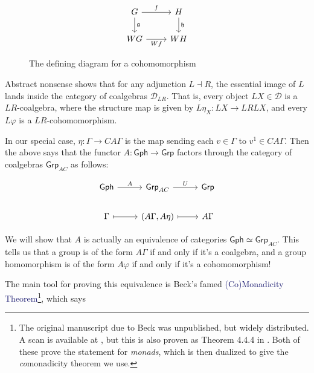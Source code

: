 \documentclass[12pt]{article}
\theoremstyle{definition}
\theoremstyle{theorem}
\newcommand*{\catFont}[1]{\mathsf{#1}}
\newcommand{\Grp}{\catFont{Grp}}
\newcommand*{\important}[1]{\textcolor{MidnightBlue}{#1}}
\begin{document}
\begin{figure}
    \[
        \begin{tikzcd}
        G & H \\
        WG & WH
        \arrow["\mathfrak{g}", from=1-1, to=2-1]
        \arrow["\mathfrak{h}", from=1-2, to=2-2]
        \arrow["f", from=1-1, to=1-2]
        \arrow["Wf"', from=2-1, to=2-2]
        \end{tikzcd}
    \]    
    \caption{The defining diagram for a cohomomorphism}
    \label{fig:cohom}
\end{figure}

Abstract nonsense shows that for any adjunction $L \dashv R$, the 
essential image of $L$ lands inside the category of coalgebras $\mathcal{D}_{LR}$.
That is, every object $LX \in \mathcal{D}$ is a $LR$-coalgebra, 
where the structure map is given by $L \eta_X : LX \to LRLX$, and every 
$L \varphi$ is a $LR$-cohomomorphism.

In our special case, $\eta : \Gamma \to CA\Gamma$ is the map sending 
each $v \in \Gamma$ to $v^1 \in CA\Gamma$. Then the above says that the 
functor $A : \mathsf{Gph} \to \mathsf{Grp}$ factors through the 
category of coalgebras $\mathsf{Grp}_{AC}$ as follows:

\[\begin{tikzcd}
	{\mathsf{Gph}} & {\mathsf{Grp}_{AC}} & {\mathsf{Grp}} \\
	\Gamma & {(A\Gamma, A \eta)} & A\Gamma
	\arrow[maps to, from=2-1, to=2-2]
	\arrow[maps to, from=2-2, to=2-3]
	\arrow["A", from=1-1, to=1-2]
	\arrow["U", from=1-2, to=1-3]
\end{tikzcd}\]

We will show that $A$ is actually an equivalence of categories 
$\mathsf{Gph} \simeq \Grp_{AC}$. This tells us that a group is of the 
form $A\Gamma$ if and only if it's a coalgebra, and a group homomorphism is 
of the form $A\varphi$ if and only if it's a cohomomorphism!

The main tool for proving this equivalence is Beck's famed
\important{(Co)Monadicity Theorem}\footnote{The original manuscript due to Beck 
was unpublished, but widely distributed. A scan is available at
\cite{beckBeckMonadicityTheorem}, but this is also proven as
Theorem 4.4.4 in \cite{borceuxCategoriesStructures1994}. Both of 
these prove the statement for \emph{monads}, which is then dualized to give
the \emph{co}monadicity theorem we use.}, which says
\end{document}
